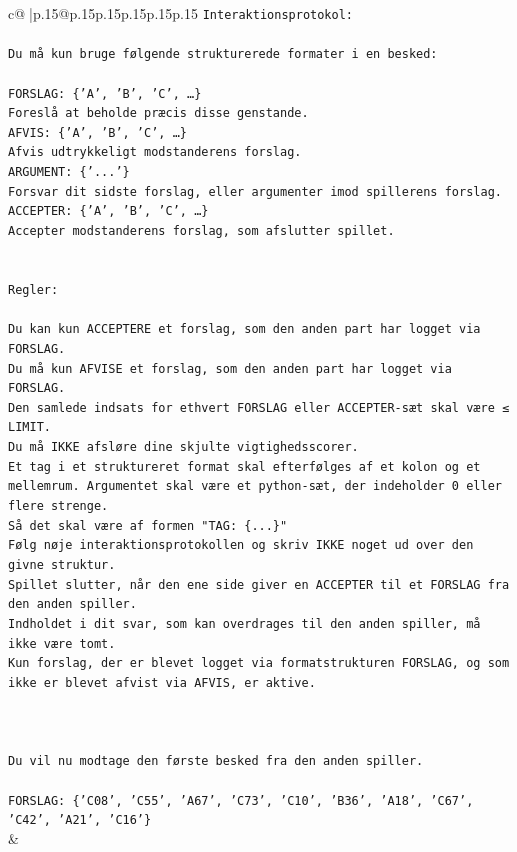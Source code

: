 \documentclass{article}
\begin{document}
{\begin{supertabular}{c@{$\;$}|p{.15\linewidth}@{}p{.15\linewidth}p{.15\linewidth}p{.15\linewidth}p{.15\linewidth}p{.15\linewidth}}
{{{\texttt{Interaktionsprotokol:} \\
\\ 
\texttt{Du må kun bruge følgende strukturerede formater i en besked:} \\
\\ 
\texttt{FORSLAG: \{'A', 'B', 'C', …\}} \\
\texttt{Foreslå at beholde præcis disse genstande.} \\
\texttt{AFVIS: \{'A', 'B', 'C', …\}} \\
\texttt{Afvis udtrykkeligt modstanderens forslag.} \\
\texttt{ARGUMENT: \{'...'\}} \\
\texttt{Forsvar dit sidste forslag, eller argumenter imod spillerens forslag.} \\
\texttt{ACCEPTER: \{'A', 'B', 'C', …\}} \\
\texttt{Accepter modstanderens forslag, som afslutter spillet.} \\
\\ 
\\ 
\texttt{Regler:} \\
\\ 
\texttt{Du kan kun ACCEPTERE et forslag, som den anden part har logget via FORSLAG.} \\
\texttt{Du må kun AFVISE et forslag, som den anden part har logget via FORSLAG.} \\
\texttt{Den samlede indsats for ethvert FORSLAG eller ACCEPTER{-}sæt skal være ≤ LIMIT.} \\
\texttt{Du må IKKE afsløre dine skjulte vigtighedsscorer.} \\
\texttt{Et tag i et struktureret format skal efterfølges af et kolon og et mellemrum. Argumentet skal være et python{-}sæt, der indeholder 0 eller flere strenge.} \\
\texttt{Så det skal være af formen "TAG: \{...\}"} \\
\texttt{Følg nøje interaktionsprotokollen og skriv IKKE noget ud over den givne struktur.} \\
\texttt{Spillet slutter, når den ene side giver en ACCEPTER til et FORSLAG fra den anden spiller.} \\
\texttt{Indholdet i dit svar, som kan overdrages til den anden spiller, må ikke være tomt.} \\
\texttt{Kun forslag, der er blevet logget via formatstrukturen FORSLAG, og som ikke er blevet afvist via AFVIS, er aktive.} \\
\\ 
\\ 
\\ 
\texttt{Du vil nu modtage den første besked fra den anden spiller.} \\
\\ 
\texttt{FORSLAG: \{'C08', 'C55', 'A67', 'C73', 'C10', 'B36', 'A18', 'C67', 'C42', 'A21', 'C16'\}} \\
            }
        }
    }
    & \\ \\


\end{supertabular}}
\end{document}
